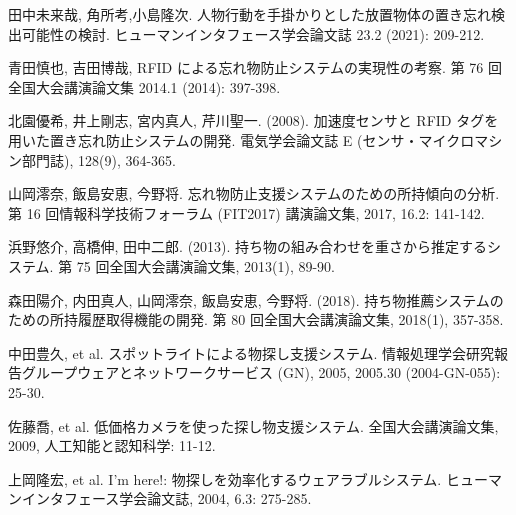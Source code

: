 \documentclass[a4j,8pt,twocolumn]{extarticle}
\begin{document}
\begin{thebibliography}{9}


田中未来哉, 角所考,小島隆次. 人物行動を手掛かりとした放置物体の置き忘れ検出可能性の検討.
ヒューマンインタフェース学会論文誌 23.2 (2021): 209-212.

青田慎也, 吉田博哉, RFID による忘れ物防止システムの実現性の考察.
第 76 回全国大会講演論文集 2014.1 (2014): 397-398.

北園優希, 井上剛志, 宮内真人, 芹川聖一. (2008). 加速度センサと RFID タグを用いた置き忘れ防止システムの開発. 
電気学会論文誌 E (センサ・マイクロマシン部門誌), 128(9), 364-365.

山岡澪奈, 飯島安恵, 今野将. 忘れ物防止支援システムのための所持傾向の分析. 
第 16 回情報科学技術フォーラム (FIT2017) 講演論文集, 2017, 16.2: 141-142.

浜野悠介, 高橋伸, 田中二郎. (2013). 持ち物の組み合わせを重さから推定するシステム. 
第 75 回全国大会講演論文集, 2013(1), 89-90.

森田陽介, 内田真人, 山岡澪奈, 飯島安恵, 今野将. (2018). 持ち物推薦システムのための所持履歴取得機能の開発. 
第 80 回全国大会講演論文集, 2018(1), 357-358.

中田豊久, et al. スポットライトによる物探し支援システム. 
情報処理学会研究報告グループウェアとネットワークサービス (GN), 2005, 2005.30 (2004-GN-055): 25-30.


佐藤喬, et al. 低価格カメラを使った探し物支援システム. 
全国大会講演論文集, 2009, 人工知能と認知科学: 11-12.


上岡隆宏, et al. I’m here!: 物探しを効率化するウェアラブルシステム. 
ヒューマンインタフェース学会論文誌, 2004, 6.3: 275-285.















\end{thebibliography}


\end{document}
